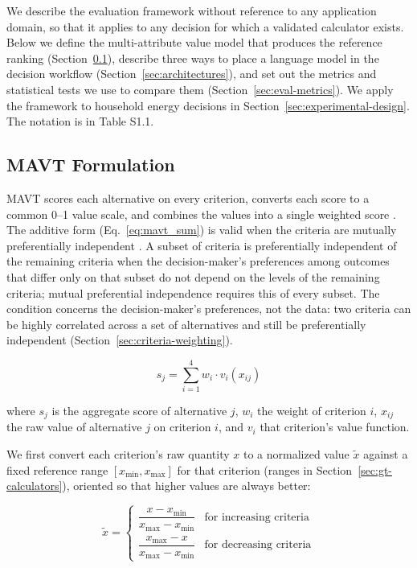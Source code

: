 \documentclass[final,3p,times]{elsarticle}
\begin{document}
We describe the evaluation framework without reference to any application domain, so that it applies to any decision for which a validated calculator exists. Below we define the multi-attribute value model that produces the reference ranking (Section~\ref{sec:mavt-design}), describe three ways to place a language model in the decision workflow (Section~\ref{sec:architectures}), and set out the metrics and statistical tests we use to compare them (Section~\ref{sec:eval-metrics}). We apply the framework to household energy decisions in Section~\ref{sec:experimental-design}. The notation is in Table S1.1.

\subsection{MAVT Formulation}
\label{sec:mavt-design}
MAVT scores each alternative on every criterion, converts each score to a common 0--1 value scale, and combines the values into a single weighted score \cite{keeneyraiffa1976,dyer1979}. The additive form (Eq.~\ref{eq:mavt_sum}) is valid when the criteria are mutually preferentially independent \cite{keeneyraiffa1976,dyer1979}. A subset of criteria is preferentially independent of the remaining criteria when the decision-maker's preferences among outcomes that differ only on that subset do not depend on the levels of the remaining criteria; mutual preferential independence requires this of every subset. The condition concerns the decision-maker's preferences, not the data: two criteria can be highly correlated across a set of alternatives and still be preferentially independent (Section~\ref{sec:criteria-weighting}).

\begin{equation}
\label{eq:mavt_sum}
s_j = \sum_{i=1}^{4} w_i \cdot v_i(x_{ij})
\end{equation}

\noindent where $s_j$ is the aggregate score of alternative $j$, $w_i$ the weight of criterion $i$, $x_{ij}$ the raw value of alternative $j$ on criterion $i$, and $v_i$ that criterion's value function.

We first convert each criterion's raw quantity $x$ to a normalized value $\tilde{x}$ against a fixed reference range $[x_{\min}, x_{\max}]$ for that criterion (ranges in Section~\ref{sec:gt-calculators}), oriented so that higher values are always better:

\begin{equation}
\label{eq:norm_x}
\tilde{x} =
\begin{cases}
\dfrac{x - x_{\min}}{x_{\max} - x_{\min}} & \text{for increasing criteria}\\[4mm]
\dfrac{x_{\max} - x}{x_{\max} - x_{\min}} & \text{for decreasing criteria}
\end{cases}
\end{equation}
\end{document}
